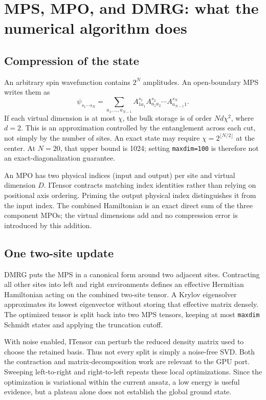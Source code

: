 \documentclass[11pt]{article}
\newcommand{\code}[1]{\nolinkurl{#1}}
\begin{document}
\section{MPS, MPO, and DMRG: what the numerical algorithm does}
\subsection{Compression of the state}
An arbitrary spin wavefunction contains $2^N$ amplitudes. An open-boundary MPS writes them as
\begin{equation}
\psi_{s_1\cdots s_N}=\sum_{a_1,\ldots,a_{N-1}}
A^{s_1}_{1a_1}A^{s_2}_{a_1a_2}\cdots A^{s_N}_{a_{N-1}1}.
\end{equation}
If each virtual dimension is at most $\chi$, the bulk storage is of order $Nd\chi^2$, where $d=2$. This is an approximation controlled by the entanglement across each cut, not simply by the number of sites. An exact state may require $\chi=2^{\lfloor N/2\rfloor}$ at the center. At $N=20$, that upper bound is 1024; setting \code{maxdim=100} is therefore not an exact-diagonalization guarantee.

An MPO has two physical indices (input and output) per site and virtual dimension $D$. ITensor contracts matching index identities rather than relying on positional axis ordering. Priming the output physical index distinguishes it from the input index. The combined Hamiltonian is an exact direct sum of the three component MPOs; the virtual dimensions add and no compression error is introduced by this addition.

\subsection{One two-site update}
DMRG puts the MPS in a canonical form around two adjacent sites. Contracting all other sites into left and right environments defines an effective Hermitian Hamiltonian acting on the combined two-site tensor. A Krylov eigensolver approximates its lowest eigenvector without storing that effective matrix densely. The optimized tensor is split back into two MPS tensors, keeping at most \code{maxdim} Schmidt states and applying the truncation cutoff.

With noise enabled, ITensor can perturb the reduced density matrix used to choose the retained basis. Thus not every split is simply a noise-free SVD. Both the contraction and matrix-decomposition work are relevant to the GPU port. Sweeping left-to-right and right-to-left repeats these local optimizations. Since the optimization is variational within the current ansatz, a low energy is useful evidence, but a plateau alone does not establish the global ground state.
\end{document}
